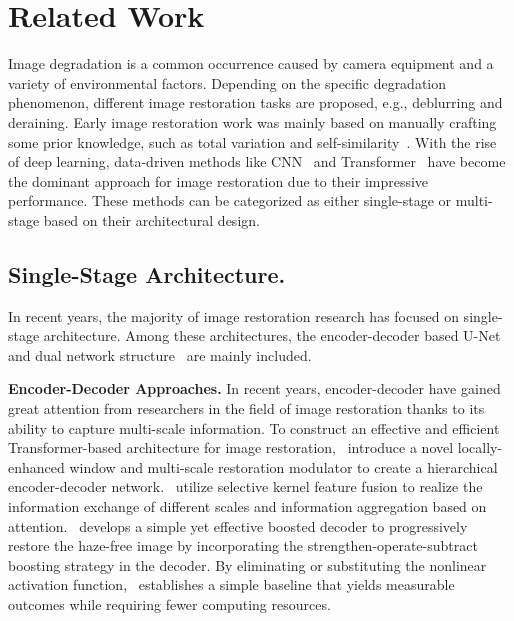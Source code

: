 \documentclass[sn-mathphys,Numbered]{sn-jnl}
\theoremstyle{thmstyleone}\newtheorem{theorem}{Theorem}\newtheorem{proposition}[theorem]{Proposition}
\theoremstyle{thmstyletwo}\newtheorem{example}{Example}\newtheorem{remark}{Remark}
\theoremstyle{thmstylethree}\newtheorem{definition}{Definition}
\begin{document}
\section{Related Work}
Image degradation is a common occurrence caused by camera equipment and a variety of environmental factors. Depending on the specific degradation phenomenon, different image restoration tasks are proposed, e.g., deblurring and deraining. Early image restoration work was mainly based on manually crafting some prior knowledge, such as total variation and self-similarity~\cite{1992Nonlinear, 1997Prior, 2002Scale, 2005Fields, 2010Single, 2011Image, 2011Single}. With the rise of deep learning, data-driven methods like CNN~\cite{r7anwar2019drln,r105zhang2018rcan,r107zhang2020rdnir,r18dudhane2021burst,Zamir2021MPRNet,Zamir2022MIRNetv2} and Transformer~\cite{conde2022swin2sr,liang2021swinir,Zamir2021Restormer,Tsai2022Stripformer,Wang_2022_CVPR} have become the dominant approach for image restoration due to their impressive performance. These methods can be categorized as either single-stage or multi-stage based on their architectural design.

\subsection{Single-Stage Architecture.}
In recent years, the majority of image restoration research has focused on single-stage architecture. Among these architectures, the encoder-decoder based U-Net~\cite{chen2022simple, chu2022nafssr, Wang_2022_CVPR,2021Rethinking,deganv2,Zamir2021MPRNet,r90ECCV2020_984,r99Zhang2020PlugandPlayIR}  and dual network structure~\cite{2018DehazeGAN,2019Dense,2019Dual,tian2021designing,2020Refining} are mainly included.

\textbf{Encoder-Decoder Approaches.} In recent years, encoder-decoder have gained great attention from researchers in the field of image restoration thanks to its ability to capture multi-scale information. To construct an effective and efficient Transformer-based architecture for image restoration,~\cite{Wang_2022_CVPR} introduce a novel locally-enhanced window and multi-scale restoration modulator to create a hierarchical encoder-decoder network.~\cite{Zamir2022MIRNetv2} utilize selective kernel feature fusion to realize the information exchange of different scales and information aggregation based on attention.~\cite{9156921} develops a simple yet effective boosted decoder to progressively restore the haze-free image by incorporating the strengthen-operate-subtract boosting strategy in the decoder.  By eliminating or substituting the nonlinear activation function,~\cite{chen2022simple} establishes a simple baseline that yields measurable outcomes while requiring fewer computing resources. 
\end{document}
